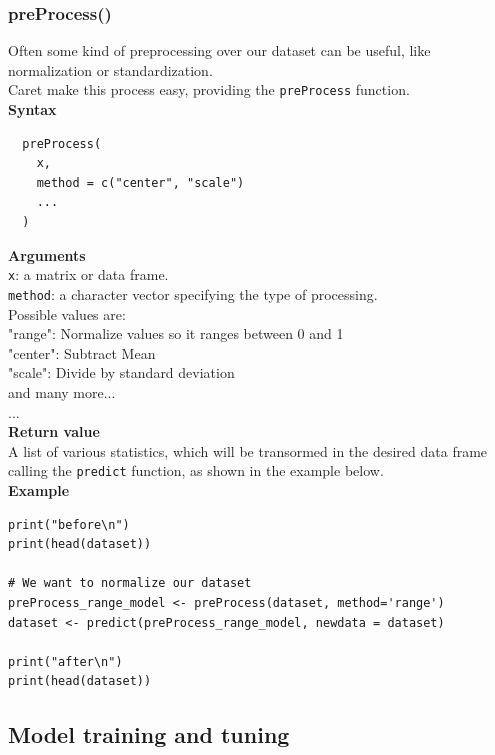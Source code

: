 \documentclass{article}
\begin{document}
\subsubsection{preProcess()}
Often some kind of preprocessing over our dataset can be useful, like normalization or standardization.\\
Caret make this process easy, providing the \texttt{preProcess} function.\\

\textbf{Syntax}
\begin{verbatim}
  preProcess(
    x,
    method = c("center", "scale")
    ...
  )
\end{verbatim}

\textbf{Arguments}\\

\texttt{x}: a matrix or data frame.\\
\texttt{method}: a character vector specifying the type of processing. \\
\phantom{..............} Possible values are:\\
\phantom{..............} "range": Normalize values so it ranges between 0 and 1\\
\phantom{..............} "center": Subtract Mean\\
\phantom{..............} "scale": Divide by standard deviation\\
\phantom{..............} and many more...\\
...\\

\textbf{Return value}\\

A list of various statistics, which will be transormed in the desired data frame calling the \texttt{predict} function, as shown in the example below.\\

\textbf{Example}\\
\begin{lstlisting}
print("before\n")
print(head(dataset))

# We want to normalize our dataset
preProcess_range_model <- preProcess(dataset, method='range')
dataset <- predict(preProcess_range_model, newdata = dataset)

print("after\n")
print(head(dataset))
\end{lstlisting}

\pagebreak

\subsection{Model training and tuning}
\end{document}
